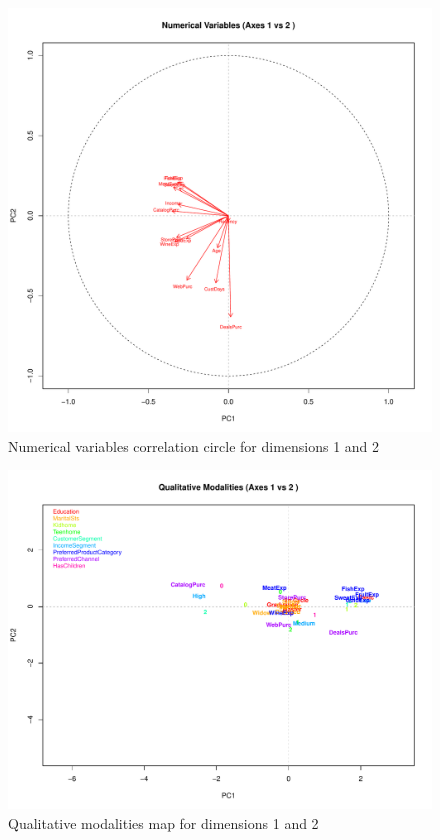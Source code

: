 \begin{figure}[H]
    \centering
    \includegraphics[width=0.9\linewidth]{Imatges/numerical_variables_map_1_2.pdf}
    \caption{Numerical variables correlation circle for dimensions 1 and 2}
    \label{fig:numerical_map_1_2}
\end{figure}

\begin{figure}[H]
    \centering
    \includegraphics[width=0.9\linewidth]{Imatges/qualitative_modalities_map_1_2.pdf}
    \caption{Qualitative modalities map for dimensions 1 and 2}
    \label{fig:qualitative_map_1_2}
\end{figure}


